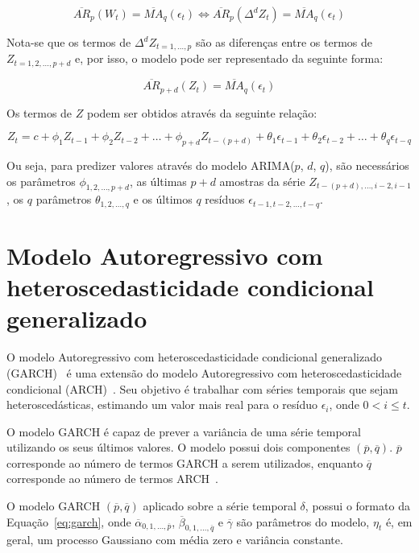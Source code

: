 \[
\displaystyle \overline{AR}_p(W_t) = \overline{MA}_q\left(\epsilon_t\right)
\Leftrightarrow \overline{AR}_p\left(\Delta^d Z_t\right) =
\overline{MA}_q\left(\epsilon_t\right)
\]

Nota-se que os termos de $\Delta^dZ_{t=1,\hdots,p}$ são as diferenças entre os
termos de $Z_{t=1,2,\hdots,p+d}$ e, por isso, o modelo pode ser representado da
seguinte forma:

\[
\overline{AR}_{p+d}\left(Z_t\right) = \overline{MA}_q\left(\epsilon_t\right)
\]

Os termos de $Z$ podem ser obtidos através da seguinte relação:

\[
Z_t = c + \phi_1Z_{t-1}+\phi_2Z_{t-2}+\hdots+\phi_{p+d}Z_{t-(p+d)} +
\theta_1\epsilon_{t-1} + \theta_2\epsilon_{t-2} + \hdots +
\theta_q\epsilon_{t-q}
\]

Ou seja, para predizer valores através do modelo ARIMA($p$, $d$, $q$), são
necessários os parâmetros $\phi_{1,2,\hdots,p+d}$, as últimas $p+d$ amostras da
série $Z_{t-(p+d), \hdots, i-2, i-1}$, os $q$ parâmetros $\theta_{1,2,\hdots,q}$
e os últimos $q$ resíduos $\epsilon_{t-1, t-2, \hdots, t-q}$.

\section{Modelo Autoregressivo com heteroscedasticidade condicional
generalizado}

O modelo Autoregressivo com heteroscedasticidade condicional
generalizado (GARCH)~\citep{Artigo:garch} é uma extensão do modelo
Autoregressivo com heteroscedasticidade condicional
(ARCH)~\citep{Artigo:arch}. Seu objetivo é trabalhar com séries temporais que
sejam heteroscedásticas, estimando um valor mais real para o resíduo
$\epsilon_i$, onde $0<i\leq t$.

O modelo GARCH é capaz de prever a variância de uma série temporal utilizando os
seus últimos valores. O modelo possui dois componentes $(\overline{p},
\overline{q})$. $\overline{p}$ corresponde ao número de termos GARCH a serem
utilizados, enquanto $\overline{q}$ corresponde ao número de termos
ARCH~\citep{Artigo:joe}.

O modelo GARCH $(\overline{p}, \overline{q})$ aplicado sobre a série
temporal $\delta$, possui o formato da Equação~\ref{eq:garch}, onde
$\overline{\alpha}_{0,1,\hdots,\overline{p}}$,
$\overline{\beta}_{0,1,\hdots,\overline{q}}$ e $\overline{\gamma}$ são
parâmetros do modelo, $\eta_t$ é, em geral, um processo Gaussiano com média zero
e variância constante.

